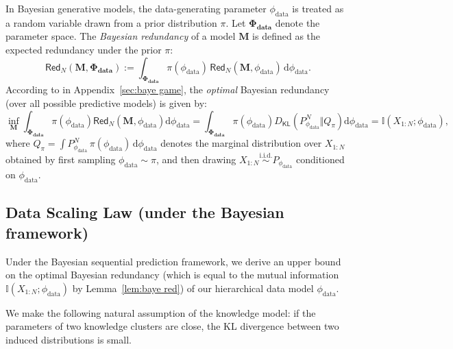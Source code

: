 \documentclass[11pt]{article}
\theoremstyle{plain}
\theoremstyle{definition}
\newcommand{\dd}{\mathrm{d}}
\newcommand{\DKL}{D_{\mathsf{KL}}}
\newcommand{\redundency}{\mathsf{Red}}
\newcommand{\Model}{\boldsymbol{M}}
\newcommand{\dataModel}{\phi_{\text{data}}}
\newcommand{\datafamily}{\mathbf{\Phi_{\text{data}}}}
\begin{document}
In Bayesian generative models, the data-generating parameter \( \dataModel \) is treated as a random variable drawn from a prior distribution \( \pi \). 
Let \( \datafamily \) denote the parameter space.
The \emph{Bayesian redundancy} of a model \( \Model \) is defined as the expected redundancy under the prior  \( \pi \):
\[
\redundency_N(\Model, \datafamily) := \int_{\datafamily} \pi(\dataModel)\, \redundency_N(\Model, \dataModel)\, \dd\dataModel.
\]
According to  in Appendix~\ref{sec:baye game}, the {\em optimal} Bayesian redundancy (over all possible predictive models) 
is given by:
\[
\inf_{\Model} \int_{\datafamily} \pi(\dataModel) \redundency_N(\Model, \dataModel) \dd\dataModel = \int_{\datafamily} \pi(\dataModel) \DKL(P_{\dataModel}^N \Vert Q_{\pi}) \dd\dataModel = \mathbb{I}(X_{1:N};\dataModel),
\]
where \( Q_{\pi} = \int P_{\dataModel}^N \, \pi(\dataModel) \, \dd\dataModel \) denotes the marginal distribution over \( X_{1:N} \) obtained by first sampling \( \dataModel \sim \pi \), and then drawing \( X_{1:N} \overset{\text{i.i.d.}}{\sim} P_{\dataModel} \) conditioned on \( \dataModel \).





\subsection{Data Scaling Law (under the Bayesian framework)} 
\label{sec:baye data law}


Under the Bayesian sequential prediction framework, we derive an upper bound on the optimal Bayesian redundancy (which is equal to the mutual information $\mathbb{I}(X_{1:N};\dataModel)$ by Lemma~\ref{lem:baye red}) of our hierarchical data model $\dataModel$. 

We make the following natural assumption of the knowledge model:
if the parameters of two knowledge clusters are close,
the KL divergence between two induced distributions is small.
\end{document}
